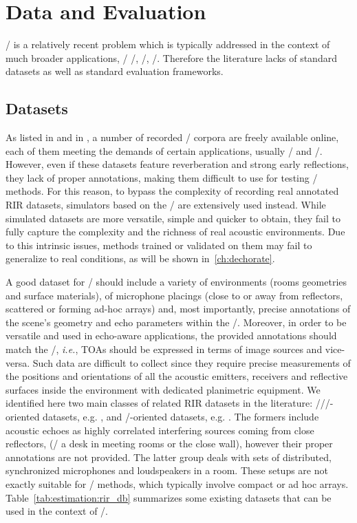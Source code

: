 \section{Data and Evaluation}\label{sec:estimation:datametrics}
\AER/ is a relatively recent problem which is typically addressed in the context of much broader applications, \eg/ \SE/, \RooGE/, \SSL/.
Therefore the literature lacks of standard datasets as well as standard evaluation frameworks.

\subsection{Datasets}
As listed in  and in , a number of recorded \RIRs/ corpora are freely available online, each of them meeting the demands of certain applications, usually \SE/ and \ASR/.
However, even if these datasets feature reverberation and strong early reflections, they lack of proper annotations, making them difficult to use for testing \AER/ methods.
For this reason, to bypass the complexity of recording real annotated RIR datasets, simulators based on the \ISM/ are extensively used instead.
While simulated datasets are more versatile, simple and quicker to obtain, they fail to fully capture the complexity and the richness of real acoustic environments.
Due to this intrinsic issues, methods trained or validated on them may fail to generalize to real conditions, as will be shown in~\cref{ch:dechorate}.

\mynewline
A good dataset for \AER/ should include a variety of environments (rooms geometries and surface materials), of microphone placings (close to or away from reflectors, scattered or forming ad-hoc arrays) and, most importantly, precise annotations of the scene's geometry and echo parameters within the \RIRs/.
Moreover, in order to be versatile and used in echo-aware applications, the provided annotations should match the \ISM/, \textit{i.e.}, TOAs should be expressed in terms of image sources and vice-versa.
Such data are difficult to collect since they require precise measurements of the positions and orientations of all the acoustic emitters, receivers and reflective surfaces inside the environment with dedicated planimetric equipment.
We identified here two main classes of related RIR datasets in the literature:
\SE//\ASR/-oriented datasets, e.g. , and \RooGE/-oriented datasets, e.g. .
The formers include acoustic echoes as highly correlated interfering sources coming from close reflectors, (\eg/ a desk in meeting rooms or the close wall), however their proper annotations are not provided.
The latter group deals with sets of distributed, synchronized microphones and loudspeakers in a room.
These setups are not exactly suitable for \SE/ methods, which typically involve compact or ad hoc arrays.
Table~\ref{tab:estimation:rir_db} summarizes some existing datasets that can be used in the context of \AER/.

